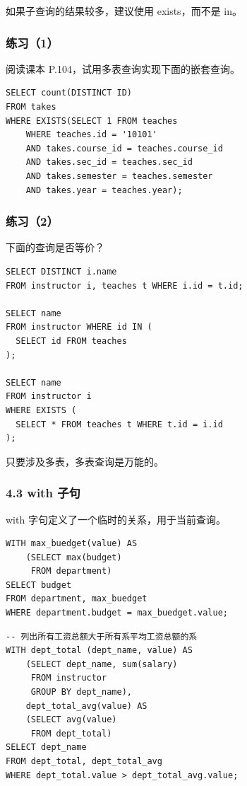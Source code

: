 \documentclass[aspectratio=169, 14pt]{beamer}
\begin{document}
{
\begin{frame}[standout]
	如果子查询的结果较多，建议使用 exists，而不是 in。
\end{frame}
}

\begin{frame}[fragile]
	\frametitle{练习（1）}
	阅读课本 P.104，试用多表查询实现下面的嵌套查询。

	\begin{verbatim}
SELECT count(DISTINCT ID)
FROM takes
WHERE EXISTS(SELECT 1 FROM teaches
    WHERE teaches.id = '10101'
    AND takes.course_id = teaches.course_id
    AND takes.sec_id = teaches.sec_id
    AND takes.semester = teaches.semester
    AND takes.year = teaches.year);
    \end{verbatim}

\end{frame}

\begin{frame}[fragile]
  \frametitle{练习（2）}
下面的查询是否等价？

	\begin{verbatim}
SELECT DISTINCT i.name
FROM instructor i, teaches t WHERE i.id = t.id;

SELECT name
FROM instructor WHERE id IN (
  SELECT id FROM teaches
);

SELECT name
FROM instructor i
WHERE EXISTS (
  SELECT * FROM teaches t WHERE t.id = i.id
);
  \end{verbatim}

\end{frame}

{
\begin{frame}[standout]
	只要涉及多表，多表查询是万能的。
\end{frame}
}

\begin{frame}[fragile]
	\frametitle{4.3 with 子句}

	\alert{with} 字句定义了一个临时的关系，用于当前查询。

	\begin{verbatim}
WITH max_buedget(value) AS
    (SELECT max(budget)
     FROM department)
SELECT budget
FROM department, max_buedget
WHERE department.budget = max_buedget.value;
\end{verbatim}
\end{frame}

\begin{frame}[fragile]

	\begin{verbatim}
-- 列出所有工资总额大于所有系平均工资总额的系
WITH dept_total (dept_name, value) AS
    (SELECT dept_name, sum(salary)
     FROM instructor
     GROUP BY dept_name),
    dept_total_avg(value) AS
    (SELECT avg(value)
     FROM dept_total)
SELECT dept_name
FROM dept_total, dept_total_avg
WHERE dept_total.value > dept_total_avg.value;
\end{verbatim}

\end{frame}
\end{document}
